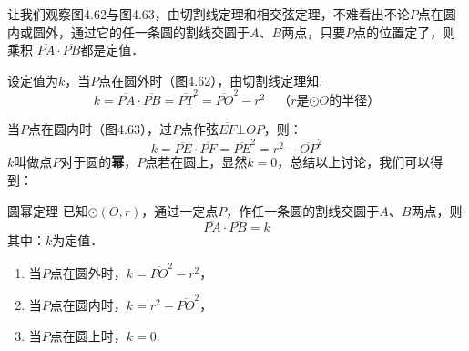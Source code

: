   \begin{figure}[htp]
    \centering
    \begin{minipage}[t]{0.48\textwidth}
    \centering
    \caption{}
    \end{minipage}
    \begin{minipage}[t]{0.48\textwidth}
    \centering
    \caption{}
    \end{minipage}
  \end{figure}
  
  让我们观察图4.62与图4.63，由切割线定理和相交弦定理，不难看出不论$P$点在圆内或圆外，通过它的任一条圆的割线交圆于$A$、$B$两点，只要$P$点的位置定了，则乘积
  $\overline{PA}\cdot \overline{PB}$都是定值．
  
  设定值为$k$，当$P$点在圆外时（图4.62），由切割线定理知.
  \[k=\overline{PA}\cdot \overline{PB}=\overline{PT}^2=\overline{PO}^2-r^2\quad \text{（$r$是$\odot O$的半径）}\]
  
  当$P$点在圆内时（图4.63），过$P$点作弦$\overline{EF}\bot OP$，则：
  \[k=\overline{PE}\cdot \overline{PF}=\overline{PE}^2=r^2-\overline{OP}^2\]
  $k$叫做点$P$对于圆的\textbf{幂}，$P$点若在圆上，显然$k=0$，总结以上讨论，我们可以得到：
  
  \begin{blk}
    {圆幂定理} 已知$\odot(O,r)$，通过一定点$P$，作任一条圆的割线交圆于$A$、$B$两点，则
   \[ \overline{PA}\cdot \overline{PB}=k\]
   其中：$k$为定值．
  \begin{enumerate}
  \item   当$P$点在圆外时，$k=\overline{PO}^2-r^2$，
  \item  当$P$点在圆内时，$k=r^2-\overline{PO}^2$，
  \item  当$P$点在圆上时，$k=0$.
  \end{enumerate}
  \end{blk}
  

